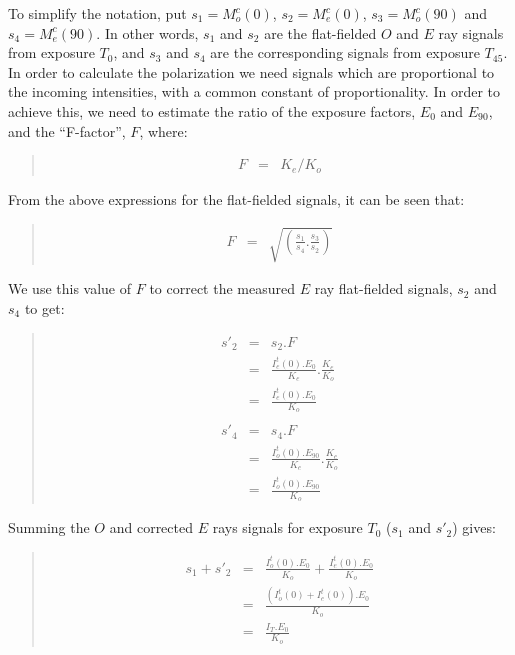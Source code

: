 \documentclass[twoside,11pt]{article}
\renewcommand{\_}{\texttt{\symbol{95}}}
\newenvironment{myquote}{\begin{quote}\begin{small}}{\end{small}\end{quote}}
\begin{document}
To simplify the notation, put $s_{1}=M^{c}_{o}(0)$, $s_{2}=M^{c}_{e}(0)$,
$s_{3}=M^{c}_{o}(90)$ and $s_{4}=M^{c}_{e}(90)$. In other words, $s_{1}$ and
$s_{2}$ are the flat-fielded $O$ and $E$ ray signals from exposure
$T_{0}$, and $s_{3}$ and $s_{4}$ are the corresponding signals from
exposure $T_{45}$. In order to calculate the polarization we need signals
which are proportional to the incoming intensities, with a common
constant of proportionality. In order to achieve this, we need to
estimate the ratio of the exposure factors, $E_{0}$ and $E_{90}$, and the 
``F-factor'', $F$, where:

\begin{myquote}
\begin{eqnarray*}
   F & = & K_{e}/K_{o}
\end{eqnarray*}
\end{myquote}

 
From the above expressions for the flat-fielded signals, it can be seen
that:

\begin{myquote}
\begin{eqnarray*}
   F & = & \sqrt {\left( \frac {s_{1}}{s_{4}} . \frac {s_{3}}{s_{2}} \right)}
\end{eqnarray*}
\end{myquote}

We use this value of $F$ to correct the measured $E$ ray flat-fielded
signals, $s_{2}$ and $s_{4}$ to get:

\begin{myquote}
\begin{eqnarray*}
   s'_{2} & = & s_{2} . F \\
         & = & \frac{ I^{t}_{e}(0).E_{0} }{ K_{e} } . \frac {K_{e}}{K_{o}} \\
         & = & \frac{ I^{t}_{e}(0).E_{0} }{ K_{o} } \\ \\
   s'_{4} & = & s_{4} . F \\
         & = & \frac{ I^{t}_{o}(0).E_{90} }{ K_{e} } . \frac {K_{e}}{K_{o}} \\
         & = & \frac{ I^{t}_{o}(0).E_{90} }{ K_{o} } 
\end{eqnarray*}
\end{myquote}

Summing the $O$ and corrected $E$ rays signals for exposure $T_{0}$ 
($s_{1}$ and $s'_{2}$) gives:

\begin{myquote}
\begin{eqnarray*}
   s_{1} + s'_{2} & = & \frac{ I^{t}_{o}(0).E_{0} }{ K_{o} } + 
                        \frac{ I^{t}_{e}(0).E_{0} }{ K_{o} } \\ 
                  & = & \frac{ ( I^{t}_{o}(0) + I^{t}_{e}(0) ).E_{0} }{ K_{o} } \\ 
                  & = & \frac{ I_{T}.E_{0} }{ K_{o} } 
\end{eqnarray*}
\end{myquote}
\end{document}
